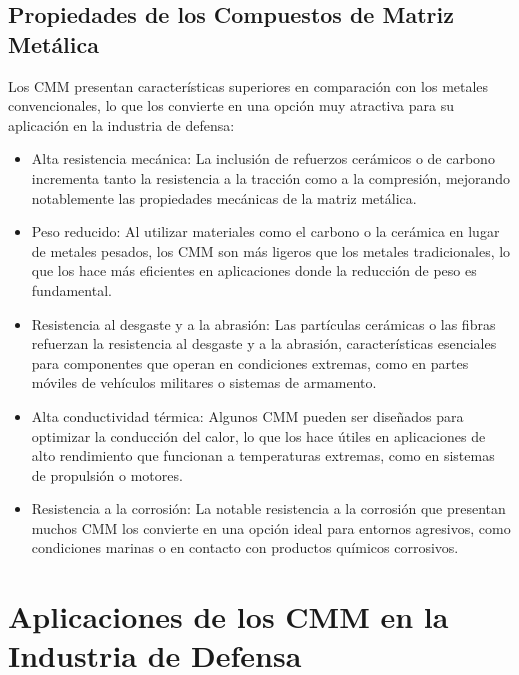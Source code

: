 \documentclass[letterpaper, 12pt]{article}
\begin{document}
\subsection{Propiedades de los Compuestos de Matriz Metálica}

Los CMM presentan características superiores en comparación con los metales
convencionales, lo que los convierte en una opción muy atractiva para su
aplicación en la industria de defensa:

\begin{itemize}
      \item Alta resistencia mecánica: La inclusión de refuerzos cerámicos o de carbono
            incrementa tanto la resistencia a la tracción como a la compresión, mejorando
            notablemente las propiedades mecánicas de la matriz metálica.
      \item Peso reducido: Al utilizar materiales como el carbono o la cerámica en lugar de
            metales pesados, los CMM son más ligeros que los metales tradicionales, lo que
            los hace más eficientes en aplicaciones donde la reducción de peso es
            fundamental.
      \item Resistencia al desgaste y a la abrasión: Las partículas cerámicas o las fibras
            refuerzan la resistencia al desgaste y a la abrasión, características
            esenciales para componentes que operan en condiciones extremas, como en partes
            móviles de vehículos militares o sistemas de armamento.
      \item Alta conductividad térmica: Algunos CMM pueden ser diseñados para optimizar la
            conducción del calor, lo que los hace útiles en aplicaciones de alto
            rendimiento que funcionan a temperaturas extremas, como en sistemas de
            propulsión o motores.
      \item Resistencia a la corrosión: La notable resistencia a la corrosión que presentan
            muchos CMM los convierte en una opción ideal para entornos agresivos, como
            condiciones marinas o en contacto con productos químicos corrosivos.

\end{itemize}

\section{Aplicaciones de los CMM en la Industria de Defensa}
\end{document}
